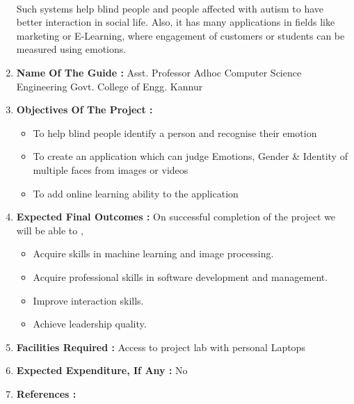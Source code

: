 \documentclass[12pt,a4paper]{article}
\begin{document}
\begin{flushleft}
\begin{enumerate}
			\paragraph{} Such systems help blind people and people affected with autism to have better interaction in social life. Also, it has many applications in fields like marketing or E-Learning, where engagement of customers or students can be measured using emotions.		
			\newline
		\item {\bfseries Name Of The Guide :}\newline\newline
			\setlength{\parindent}{1cm}
			\newline
			\indent Asst. Professor Adhoc \newline
			\indent Computer Science Engineering \newline
			\indent Govt. College of Engg. Kannur \newline
			
		\item {\bfseries Objectives Of The Project : }
		\begin{itemize}
			\item To help blind people identify a person and recognise their emotion
			\item To create an application which can judge Emotions, Gender \& Identity of multiple faces from images or videos
			\item To add online learning ability to the application
		\end{itemize}
		
		\item {\bfseries Expected Final Outcomes : } \newline
		On successful completion of the project we will be able to ,
		\begin{itemize}
			\item Acquire skills in machine learning and image processing.
			\item Acquire professional skills in software development and management.
			\item Improve interaction skills.
			\item Achieve leadership quality.
		\end{itemize}
		
		\item {\bfseries Facilities Required : } \newline
		\setlength{\parindent}{1cm}
		\indent Access to project lab with personal Laptops
		
		
		\item {\bfseries Expected Expenditure, If Any : } No
		
		\item {\bfseries References : }
			
			\nocite{kazemi2014one}
			\nocite{dalal2005histograms}
			\nocite{belhumeur1997eigenfaces}
			\nocite{ahonen2006face}
			\nocite{face}
			\nocite{gender}
						
		
	\end{enumerate}
\end{flushleft}
\end{document}
